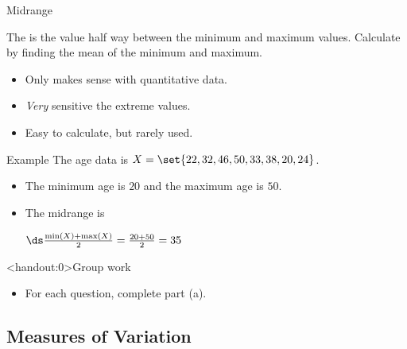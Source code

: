 \documentclass[xcolor=table, handout]{beamer}
\begin{document}
\begin{frame}{Midrange}
\begin{block}{}
\large
The  is the value half way between the minimum and maximum values. Calculate by finding the mean of the minimum and maximum.
\begin{itemize}
\item Only makes sense with quantitative data.
\item \emph{Very} sensitive the extreme values.
\item Easy to calculate, but rarely used.
\end{itemize}
\end{block}

\pause
\begin{exampleblock}{Example}
The age data is $X = \set{22, 32, 46, 50, 33, 38, 20, 24}$.
\begin{itemize}
\item The minimum age is $20$ and the maximum age is $50$.
\item The midrange is \\
\smallskip
{\centering
$\ds \frac {\min(X) + \max(X)}{2} = \frac {20 + 50}{2} = 35$
\par}
\end{itemize}
\smallskip
\end{exampleblock}

\end{frame}


\begin{frame}<handout:0>{Group work}
\begin{block}{}
\large
\begin{itemize}
\item For each question, complete part (a).
\end{itemize}
\end{block}
\end{frame}



\subsection{Measures of Variation}
\end{document}
